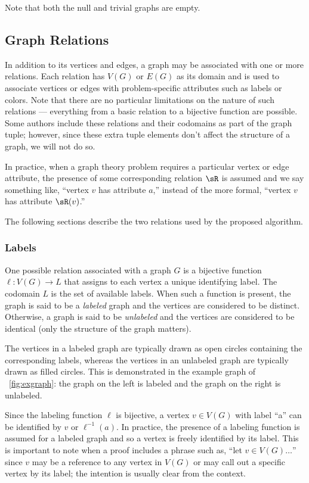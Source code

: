 Note that both the null and trivial graphs are empty.

\subsection{Graph Relations}\label{sec:sub:relations}

In addition to its vertices and edges, a graph may be associated with one or more relations.  Each relation has
\(V(G)\) or \(E(G)\) as its domain and is used to associate vertices or edges with problem-specific attributes such
as labels or colors.  Note that there are no particular limitations on the nature of such relations --- everything
from a basic relation to a bijective function are possible.  Some authors include these relations and their
codomains as part of the graph tuple; however, since these extra tuple elements don't affect the structure of a
graph, we will not do so.

In practice, when a graph theory problem requires a particular vertex or edge attribute, the presence of some
corresponding relation \(\sR\) is assumed and we say something like, ``vertex \(v\) has attribute \(a\),'' instead
of the more formal, ``vertex \(v\) has attribute \(\sR(v)\).''

The following sections describe the two relations used by the proposed algorithm.

\subsubsection{Labels}\label{sec:sub:sub:labels}

One possible relation associated with a graph \(G\) is a bijective function \(\ell:V(G)\to L\) that assigns to each
vertex a unique identifying label.  The codomain \(L\) is the set of available labels.  When such a function is
present, the graph is said to be a \emph{labeled} graph and the vertices are considered to be distinct.  Otherwise,
a graph is said to be \emph{unlabeled} and the vertices are considered to be identical (only the structure of the
graph matters).

The vertices in a labeled graph are typically drawn as open circles containing the corresponding labels, whereas
the vertices in an unlabeled graph are typically drawn as filled circles.  This is demonstrated in the example
graph of \figurename~\ref{fig:exgraph}: the graph on the left is labeled and the graph on the right is unlabeled.

Since the labeling function \(\ell\) is bijective, a vertex \(v\in V(G)\) with label ``a'' can be identified by
\(v\) or \(\ell^{-1}(a)\).  In practice, the presence of a labeling function is assumed for a labeled graph and so
a vertex is freely identified by its label.  This is important to note when a proof includes a phrase such as,
``let \(v\in V(G)\ldots\)'' since \(v\) may be a reference to any vertex in \(V(G)\) or may call out a specific
vertex by its label; the intention is usually clear from the context.

